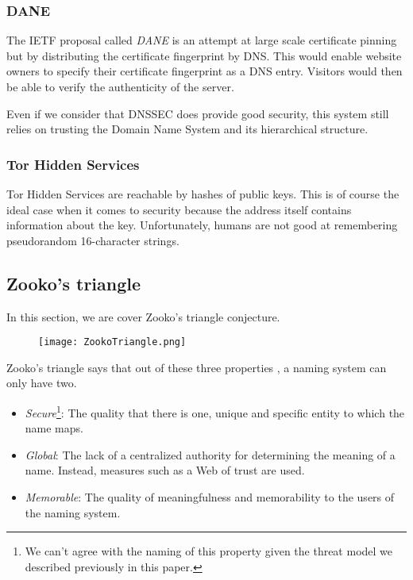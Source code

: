 \documentclass{vldb}
\begin{document}
\subsubsection{DANE}

The IETF proposal called \emph{DANE} is an attempt at large scale certificate pinning but by distributing the certificate fingerprint by DNS. This would enable website owners to specify their certificate fingerprint as a DNS entry. Visitors would then be able to verify the authenticity of the server.

Even if we consider that DNSSEC does provide good security, this system still relies on trusting the Domain Name System and its hierarchical structure.

\subsubsection{Tor Hidden Services}

Tor Hidden Services are reachable by hashes of public keys. This is of course the ideal case when it comes to security because the address itself contains information about the key. Unfortunately, humans are not good at remembering pseudorandom 16-character strings.

\subsection{Zooko's triangle}
In this section, we are cover Zooko's triangle conjecture.

\begin{figure}[h!]
\centering
\texttt{[image: ZookoTriangle.png]}
\end{figure}

Zooko's triangle says that out of these three properties \cite{zookoTriangleWikipedia}, a naming system can only have two.
\begin{itemize}
\item \emph{Secure}\footnote{We can't agree with the naming of this property given the threat model we described previously in this paper.}: The quality that there is one, unique and specific entity to which the name maps.
\item \emph{Global}: The lack of a centralized authority for determining the meaning of a name. Instead, measures such as a Web of trust are used.
\item \emph{Memorable}: The quality of meaningfulness and memorability to the users of the naming system.
\end{itemize}
\end{document}
